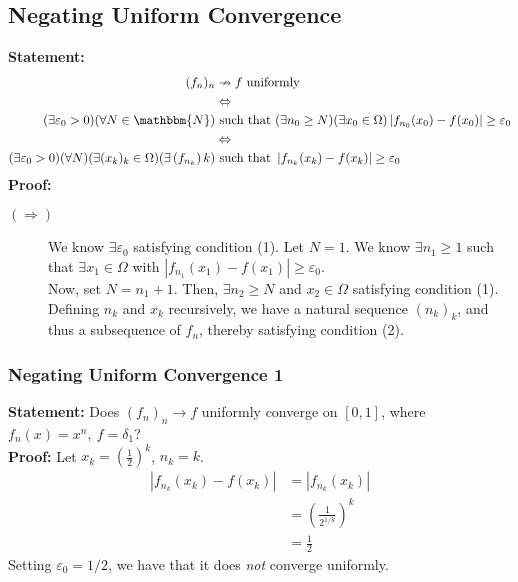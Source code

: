 \documentclass[10pt]{extarticle}
\newcommand{\N}{\mathbbm{N}}
\begin{document}
  \subsection{Negating Uniform Convergence}%
  \textbf{Statement:}
    \begin{align*}
      (f_n)_n &\nrightarrow f \text{ uniformly }\\
              &\Leftrightarrow\\
      (\exists \varepsilon_0 > 0)(\forall N\in\N)&\text{ such that } (\exists n_0 \geq N)(\exists x_0\in\Omega) \left|f_{n_0}(x_0) - f(x_0)\right| \geq \varepsilon_0\\
                                                 &\Leftrightarrow\\
      (\exists \varepsilon_0 > 0)(\forall N)(\exists (x_k)_k\in\Omega)(\exists \left(f_{n_k}\right)k) &\text{ such that } \left|f_{n_k}(x_k) - f(x_k)\right| \geq \varepsilon_0
    \end{align*}
    \textbf{Proof:}
    \begin{description}
      \item[$(\Rightarrow)$] We know $\exists \varepsilon_0$ satisfying condition (1). Let $N = 1$. We know $\exists n_1 \geq 1$ such that $\exists x_1\in\Omega$ with $|f_{n_1}(x_1) - f(x_1)| \geq \varepsilon_0$.\\

        Now, set $N = n_1 + 1$. Then, $\exists n_2 \geq N$ and $x_2\in\Omega$ satisfying condition (1).\\

        Defining $n_k$ and $x_k$ recursively, we have a natural sequence $(n_k)_k$, and thus a subsequence of $f_n$, thereby satisfying condition (2).
    \end{description}
    \subsubsection{Negating Uniform Convergence 1}%
    \textbf{Statement:} Does $\left(f_n\right)_n \rightarrow f$ uniformly converge on $[0,1]$, where $f_n(x) = x^n,~f = \delta_1$?\\

    \textbf{Proof:} Let $x_k = \left(\frac{1}{2}\right)^k$, $n_k = k$.
    \begin{align*}
      \left|f_{n_k}(x_k) - f(x_k)\right| &= \left|f_{n_k}(x_k)\right|\\
                                         &= \left(\frac{1}{2^{1/k}}\right)^k\\
                                         &= \frac{1}{2}
    \end{align*}
    Setting $\varepsilon_0 = 1/2$, we have that it does \textit{not} converge uniformly.
\end{document}
